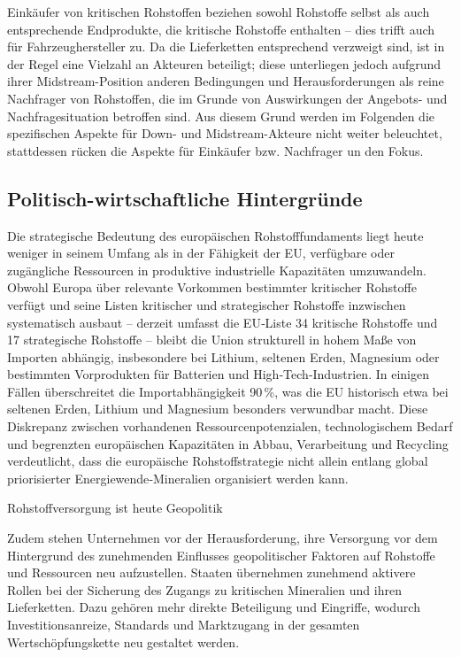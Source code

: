 \documentclass[12pt,a4paper,oneside]{book} %
\begin{document}
	Einkäufer von kritischen Rohstoffen beziehen sowohl Rohstoffe selbst als auch entsprechende Endprodukte, die kritische Rohstoffe enthalten -- dies trifft auch für Fahrzeughersteller zu. Da die Lieferketten entsprechend verzweigt sind, ist in der Regel eine Vielzahl an Akteuren beteiligt; diese unterliegen jedoch aufgrund ihrer Midstream-Position anderen Bedingungen und Herausforderungen als reine Nachfrager von Rohstoffen, die im Grunde von Auswirkungen der Angebots- und Nachfragesituation betroffen sind. Aus diesem Grund werden im Folgenden die spezifischen Aspekte für Down- und Midstream-Akteure nicht weiter beleuchtet, stattdessen rücken die Aspekte für Einkäufer bzw. Nachfrager un den Fokus.
	
	\subsection{Politisch-wirtschaftliche Hintergründe}
	
	Die strategische Bedeutung des europäischen Rohstofffundaments liegt heute weniger in seinem Umfang als in der Fähigkeit der EU, verfügbare oder zugängliche Ressourcen in produktive industrielle Kapazitäten umzuwandeln. Obwohl Europa über relevante Vorkommen bestimmter kritischer Rohstoffe verfügt und seine Listen kritischer und strategischer Rohstoffe inzwischen systematisch ausbaut – derzeit umfasst die EU‑Liste 34 kritische Rohstoffe und 17 strategische Rohstoffe  – bleibt die Union strukturell in hohem Maße von Importen abhängig, insbesondere bei Lithium, seltenen Erden, Magnesium oder bestimmten Vorprodukten für Batterien und High‑Tech‑Industrien. In einigen Fällen überschreitet die Importabhängigkeit 90 \%, was die EU historisch etwa bei seltenen Erden, Lithium und Magnesium besonders verwundbar macht. Diese Diskrepanz zwischen vorhandenen Ressourcenpotenzialen, technologischem Bedarf und begrenzten europäischen Kapazitäten in Abbau, Verarbeitung und Recycling verdeutlicht, dass die europäische Rohstoffstrategie nicht allein entlang global priorisierter Energiewende‑Mineralien organisiert werden kann.
	
	
	\glqq Rohstoffversorgung ist heute Geopolitik\grqq \autocite{https://www.nzz.ch/pro/europas-angst-vor-rohstoffmangel-wie-der-kontinent-versucht-sich-von-china-zu-emanzipieren-ld.1822991}
	
	Zudem stehen Unternehmen vor der Herausforderung, ihre Versorgung vor dem Hintergrund des zunehmenden Einflusses geopolitischer Faktoren auf Rohstoffe und Ressourcen neu aufzustellen.\autocite{HR 189 (2025), 383, 386} Staaten übernehmen zunehmend aktivere Rollen bei der Sicherung des Zugangs zu kritischen Mineralien und ihren Lieferketten. Dazu gehören mehr direkte Beteiligung und Eingriffe, wodurch Investitionsanreize, Standards und Marktzugang in der gesamten Wertschöpfungskette neu gestaltet werden.
	
\end{document}
